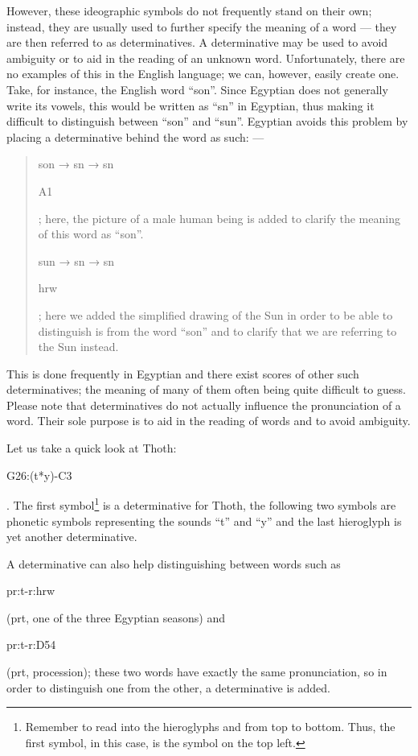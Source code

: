 \documentclass[a5paper,twoside,11pt]{report}
\begin{document}
		However, these ideographic symbols do not frequently stand on their own; instead, they are usually used to further specify the meaning of a word — they are then referred to as determinatives. A determinative may be used to avoid ambiguity or to aid in the reading of an unknown word. Unfortunately, there are no examples of this in the English language; we can, however, easily create one. Take, for instance, the English word “son”. Since Egyptian does not generally write its vowels, this would be written as “sn” in Egyptian, thus making it difficult to distinguish between “son” and “sun”. Egyptian avoids this problem by placing a determinative behind the word as such: —

    \begin{quote}
      son → sn → sn\begin{hieroglyph}A1\end{hieroglyph}; here, the picture of a male human being is added to clarify the meaning of this word as “son”.

      sun → sn → sn\begin{hieroglyph}hrw\end{hieroglyph}; here we added the simplified drawing of the Sun in order to be able to distinguish is from the word “son” and to clarify that we are referring to the Sun instead.
    \end{quote}

    This is done frequently in Egyptian and there exist scores of other such determinatives; the meaning of many of them often being quite difficult to guess. Please note that determinatives do not actually influence the pronunciation of a word. Their sole purpose is to aid in the reading of words and to avoid ambiguity.

		Let us take a quick look at Thoth: \begin{hieroglyph}G26:(t*y)-C3\end{hieroglyph}. The first symbol\footnote{Remember to read into the hieroglyphs and from top to bottom. Thus, the first symbol, in this case, is the symbol on the top left.} is a determinative for Thoth, the following two symbols are phonetic symbols representing the sounds “t” and “y” and the last hieroglyph is yet another determinative. 
		
		A determinative can also help distinguishing between words such as \begin{hieroglyph}pr:t-r:hrw\end{hieroglyph} (prt, one of the three Egyptian seasons) and \begin{hieroglyph}pr:t-r:D54\end{hieroglyph} (prt, procession); these two words have exactly the same pronunciation, so in order to distinguish one from the other, a determinative is added.
\end{document}
